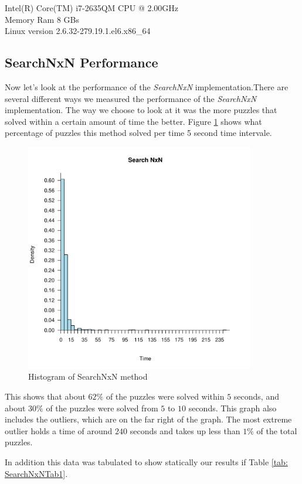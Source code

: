 \documentclass[letterpaper]{article}
\begin{document}
Intel(R) Core(TM) i7-2635QM CPU @ 2.00GHz\\
\indent Memory Ram 8 GBs\\
\indent Linux version 2.6.32-279.19.1.el6.x86\_64

\subsection{SearchNxN Performance}
Now let's look at the performance of the \emph{SearchNxN} implementation.There are several different ways we measured the performance of the \emph{SearchNxN} implementation. The way we choose to look at it was the more puzzles that solved within a certain amount of time the better. Figure \ref{fig:search-time-complex-hist} shows what percentage of puzzles this method solved per time 5 second time intervale.

\begin{figure}[h]
	\centering
	\includegraphics[width=100mm]{../stats/searchNxNEasy.pdf}
	\caption{Histogram of SearchNxN method}
	\label{fig:search-time-complex-hist}
\end{figure}

This shows that about $62\%$ of the puzzles were solved within $5$ seconds, and about $30\%$ of the puzzles were solved from $5$ to $10$ seconds. This graph also includes the outliers, which are on the far right of the graph. The most extreme outlier holds a time of around $240$ seconds and takes up less than $1\%$ of the total puzzles.

In addition this data was tabulated to show statically our results if Table \ref{tab: SearchNxNTab1}.
\end{document}
